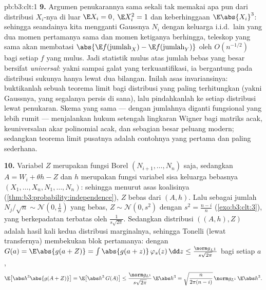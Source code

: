 \begin{solution}{pb:b3:clt:1}
\textbf{9.} Argumen penukarannya sama sekali tak memakai apa pun dari distribusi
$X_i$-nya di luar $\E X_i = 0$, $\E X_i^2 = 1$ dan
keberhinggaan $\E\abs{X_i}^3$: sehingga seandainya kita mengganti Gaussnya
$N_i$ dengan keluarga i.i.d.\ lain yang dua momen pertamanya
sama dan momen ketiganya berhingga, teleskop yang sama akan
membatasi $\abs{\E f(\text{jumlah}_X) - \E f(\text{jumlah}_Y)}$ oleh
$O(n^{-1/2})$ bagi setiap $f$ yang mulus. Jadi statistik mulus atas
jumlah bebas yang besar bersifat \emph{universal}: yakni sampai
galat yang terkuantifikasi, ia bergantung pada distribusi sukunya hanya
lewat dua bilangan. Inilah asas invariansinya:
buktikanlah sebuah teorema limit bagi distribusi yang paling terhitungkan (yakni
Gaussnya, yang segalanya persis di sana), lalu pindahkanlah ke
setiap distribusi lewat penukaran. Skema yang sama --- dengan jumlahnya diganti
fungsional yang lebih rumit --- menjalankan hukum setengah lingkaran Wigner
bagi matriks acak, keuniversalan akar polinomial
acak, dan sebagian besar peluang modern; sedangkan teorema limit
pusatnya adalah contohnya yang pertama dan paling sederhana.

\textbf{10.} Variabel $Z$ merupakan fungsi Borel $(N_{i+1}, \dots,
N_n)$ saja, sedangkan $A = W_i + \theta h - Z$ dan $h$ merupakan
fungsi variabel sisa keluarga bebasnya
$(X_1, \dots, X_n, N_1, \dots, N_n)$: sehingga menurut
asas koalisinya (\cref{thm:b3:probability:independence}),
$Z$ bebas dari $(A, h)$. Lalu sebagai jumlah
$N_j/\sqrt n \sim \mathcal N(0, \frac1n)$ yang bebas, $Z \sim \mathcal
N(0, s^2)$ dengan $s^2 = \frac{n-i}n$ (\cref{exo:b3:clt:3}),
yang berkepadatan terbatas oleh $\frac1{s\sqrt{2\pi}}$. Sedangkan distribusi
$((A, h), Z)$ adalah hasil kali kedua distribusi marginalnya, sehingga
Tonelli (lewat transfernya) membekukan blok pertamanya: dengan $G(a) =
\E\abs{g(a + Z)} = \int\abs{g(a + z)}\,\varphi_s(z)\,\dd z
\leq \frac{\norm g_{L^1}}{s\sqrt{2\pi}}$ bagi setiap $a$,
\[
\E\bigl[\abs h^3\abs{g(A + Z)}\bigr] =
\E\bigl[\abs h^3\,G(A)\bigr] \leq
\frac{\norm g_{L^1}}{s\sqrt{2\pi}}\,\E\abs h^3
= \sqrt{\frac{n}{2\pi(n-i)}}\,\norm g_{L^1}\,\E\abs h^3 .
\]


\end{solution}
